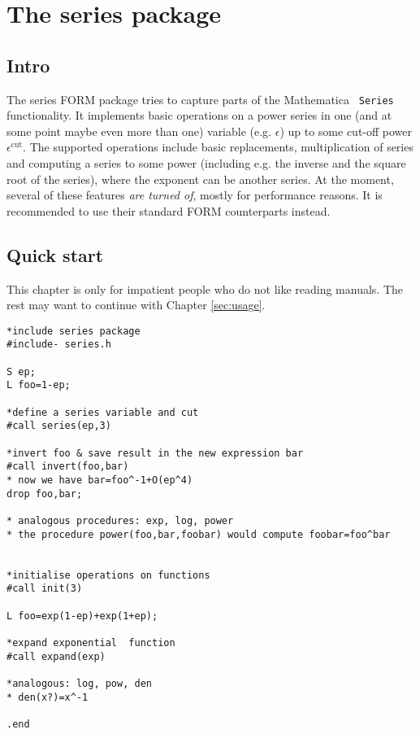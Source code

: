 \documentclass{article}
\begin{document}
\section{The series package}

\subsection{Intro}

The series FORM package tries to capture parts of the Mathematica {\tt
  Series} functionality. It implements basic operations on a power
series in one (and at some point maybe even more than one) variable
(e.g. $\epsilon$) up to some cut-off power $\epsilon^{\text{cut}}$. The
supported operations include basic replacements, multiplication of
series and computing a series to some power (including e.g. the inverse and
the square root of the series), where the exponent can be another
series. At the moment, several of these features {\em are turned of},
mostly for performance reasons. It is recommended to use their
standard FORM counterparts instead.

\subsection{Quick start}
\label{sec:quick}

This chapter is only for impatient people who do not like reading
manuals. The rest may want to continue with Chapter \ref{sec:usage}.

\begin{verbatim}
*include series package
#include- series.h

S ep;
L foo=1-ep;

*define a series variable and cut
#call series(ep,3)

*invert foo & save result in the new expression bar
#call invert(foo,bar)
* now we have bar=foo^-1+O(ep^4)
drop foo,bar;

* analogous procedures: exp, log, power
* the procedure power(foo,bar,foobar) would compute foobar=foo^bar


*initialise operations on functions
#call init(3)

L foo=exp(1-ep)+exp(1+ep);

*expand exponential  function
#call expand(exp)

*analogous: log, pow, den
* den(x?)=x^-1

.end
\end{verbatim}
\end{document}
